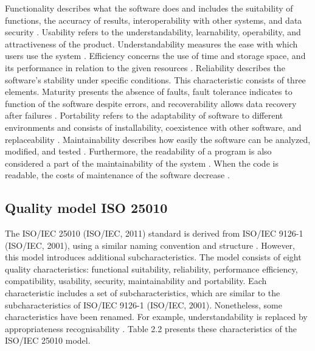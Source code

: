 Functionality describes what the software does and includes the suitability of functions, the accuracy of results, interoperability with other systems, and data security \cite{spinellis2006code}. Usability refers to the understandability, learnability, operability, and attractiveness of the product. Understandability measures the ease with which users use the system \cite{dugalic2012iso}. Efficiency concerns the use of time and storage space, and its performance in relation to the given resources \cite{dugalic2012iso}. Reliability describes the software’s stability under specific conditions. This characteristic consists of three elements. Maturity presents the absence of faults, fault tolerance indicates to function of the software despite errors, and recoverability allows data recovery after failures \cite{spinellis2006code}. Portability refers to the adaptability of software to different environments and consists of installability,  coexistence with other software, and replaceability \cite{spinellis2006code}. Maintainability describes how easily the software can be analyzed, modified, and tested \cite{spinellis2006code}. Furthermore, the readability of a program is also considered a part of the maintainability of the system \cite{buse2009learning}.  When the code is readable, the costs of maintenance of the software decrease \cite{sedano2016code}.





\subsection{Quality model ISO 25010 }


The ISO/IEC 25010 (ISO/IEC, 2011) standard is derived from ISO/IEC 9126-1 (ISO/IEC, 2001), using a similar naming convention and structure \cite{zapata2013development}. However, this model introduces additional subcharacteristics. The model consists of eight quality characteristics: functional suitability, reliability, performance efficiency, compatibility, usability, security, maintainability and portability.  
Each characteristic includes a set of subcharacteristics, which are similar to the subcharacteristics of ISO/IEC 9126-1 (ISO/IEC, 2001). Nonetheless, some characteristics  have been renamed. For example, understandability is replaced by appropriateness recognisability \cite{zapata2013development}. Table 2.2 presents these characteristics of the ISO/IEC 25010 model.


